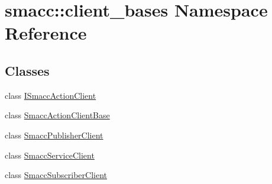 \hypertarget{namespacesmacc_1_1client__bases}{}\section{smacc\+:\+:client\+\_\+bases Namespace Reference}
\label{namespacesmacc_1_1client__bases}
\subsection*{Classes}
\begin{DoxyCompactItemize}
\item 
class \hyperlink{classsmacc_1_1client__bases_1_1ISmaccActionClient}{I\+Smacc\+Action\+Client}
\item 
class \hyperlink{classsmacc_1_1client__bases_1_1SmaccActionClientBase}{Smacc\+Action\+Client\+Base}
\item 
class \hyperlink{classsmacc_1_1client__bases_1_1SmaccPublisherClient}{Smacc\+Publisher\+Client}
\item 
class \hyperlink{classsmacc_1_1client__bases_1_1SmaccServiceClient}{Smacc\+Service\+Client}
\item 
class \hyperlink{classsmacc_1_1client__bases_1_1SmaccSubscriberClient}{Smacc\+Subscriber\+Client}
\end{DoxyCompactItemize}
